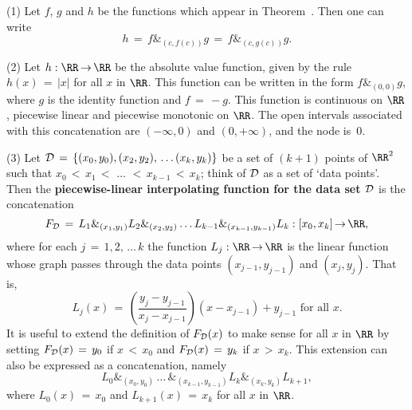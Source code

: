 {\V

\hspace*{\parindent}(1) Let $f$, $g$ and $h$ be the functions which appear in Theorem~.
    Then one can write
        \begin{displaymath}
        h \,=\, f\mbox{\&}_{(c,f(c))}g \,=\, f\mbox{\&}_{(c,g(c))}g.
        \end{displaymath}

\V

        (2) Let $h:{\RR} \,{\rightarrow}\, {\RR}$ be the absolute value function, given by the rule $h(x) \,=\, |x|$ for all $x$ in ${\RR}$.
    This function can be written in the form $f\mbox{\&}_{(0,0)}g$, where $g$ is the identity function and $f \,=\, -g$.
    This function is continuous on ${\RR}$, piecewise linear and piecewise monotonic on ${\RR}$.
    The open intervals associated with this concatenation are $(-{\infty},0)$ and $(0,+{\infty})$, and the node is~$0$.

\V

        (3) Let ${\cal D} \,=\, \{(x_{0},y_{0}),  (x_{2},y_{2}),\,{\ldots}\, (x_{k},y_{k})\}$ be a set of $(k+1)$ points of ${\RR}^{2}$ such that $x_{0}\,<\,x_{1}\,<\,\,{\ldots}\,\,<\,x_{k-1}\,<\,x_{k}$;
    think of ${\cal D}$ as a set of `data points'.
    Then the {\bf piecewise-linear interpolating function for the data set ${\cal D}$} is the concatenation
        \begin{displaymath}
        F_{{\cal D}} \,=\, L_{1}\mbox{\&}_{(x_{1},y_{1})}L_{2}\mbox{\&}_{(x_{2},y_{2})}\,{\ldots}\,L_{k-1}\mbox{\&}_{(x_{k-1},y_{k-1})}L_{k}:[x_{0},x_{k}] \,{\rightarrow}\, {\RR},
        \end{displaymath}
    where for each $j \,=\, 1,2,\,{\ldots}\,k$ the function $L_{j}:{\RR} \,{\rightarrow}\, {\RR}$ is the linear function whose graph passes through the data points $(x_{j-1},y_{j-1})$ and $(x_{j},y_{j})$.
    That is,
        \begin{displaymath}
        L_{j}(x) \,=\, \left(\frac{y_{j}-y_{j-1}}{x_{j}-x_{j-1}}\right)(x-x_{j-1}) + y_{j-1} \mbox{ for all $x$}.
        \end{displaymath}
    It is useful to extend the definition of $F_{{\cal D}}(x)$ to make sense for all $x$ in ${\RR}$ by setting $F_{{\cal D}}(x) \,=\, y_{0}$ if $x\,<\,x_{0}$ and $F_{{\cal D}}(x) \,=\, y_{k}$ if $x\,>\,x_{k}$.
    This extension can also be expressed as a concatenation, namely
        \begin{displaymath}
        L_{0}\mbox{\&}_{(x_{0},y_{0})}\,{\ldots}\,\mbox{\&}_{(x_{k-1},y_{k-1})}L_{k}\mbox{\&}_{(x_{k},y_{k})}L_{k+1},
        \end{displaymath}
    where $L_{0}(x) \,=\, x_{0}$ and $L_{k+1}(x) \,=\, x_{k}$ for all $x$ in ${\RR}$.

}
